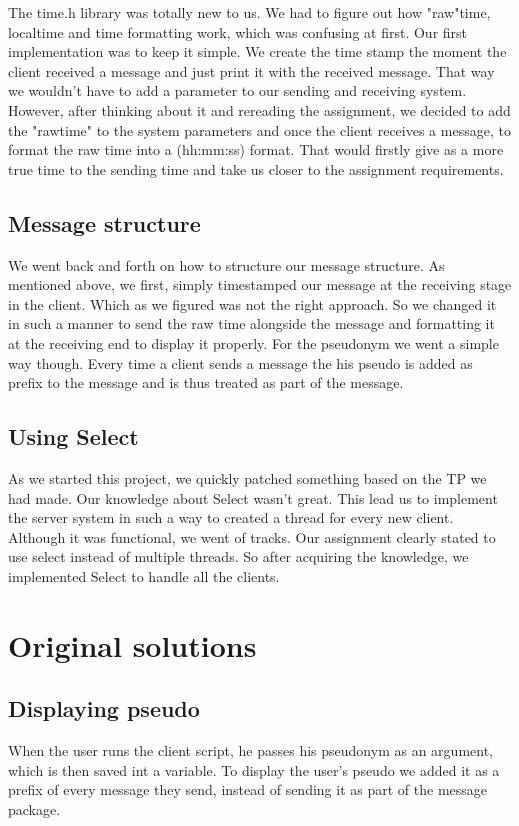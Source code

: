 \documentclass{article}
\begin{document}
The time.h library was totally new to us. We had to figure out how "raw"time, localtime and time formatting work, which was confusing at first. Our first implementation was to keep it simple. We create the time stamp the moment the client received a message and just print it with the received message. That way we wouldn't have to add a parameter to our sending and receiving system.
However, after thinking about it and rereading the assignment, we decided to add the "rawtime" to the system parameters and once the client receives a message, to format the raw time into a (hh:mm:ss) format.
That would firstly give as a more true time to the sending time and take us closer to the assignment requirements.

\subsection{Message structure}
We went back and forth on how to structure our message structure. As mentioned above, we first, simply timestamped our message at the receiving stage in the client. Which as we figured was not the right approach. So we changed it in such a manner to send the raw time alongside the message and formatting it at the receiving end to display it properly.
For the pseudonym we went a simple way though. Every time a client sends a message the his pseudo is added as prefix to the message and is thus treated as part of the message.

\newpage

\subsection{Using Select}
As we started this project, we quickly patched something based on the TP we had made. Our knowledge about Select wasn't great. This lead us to implement the server system in such a way to created a thread for every new client. Although it was functional, we went of tracks. Our assignment clearly stated to use select instead of multiple threads. So after acquiring the knowledge, we implemented Select to handle all the clients.  

\section{Original solutions}

\subsection{Displaying pseudo}
When the user runs the client script, he passes his pseudonym as an argument, which is then saved int a variable. To display the user's pseudo we added it as a prefix of every message they send, instead of sending it as part of the message package. 
\end{document}
